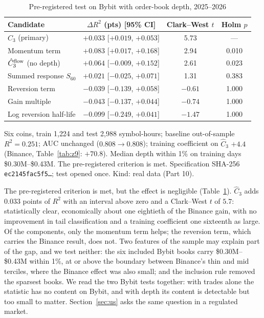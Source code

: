 \begin{table}[t]\centering\small
\begin{threeparttable}
\caption{Pre-registered test on Bybit with order-book depth, 2025--2026}\label{tab:bybitob}
\setlength{\tabcolsep}{3pt}
\begin{tabular}{lccc}
\toprule
Candidate & $\Delta R^2$ (pts) [95\% CI] & Clark--West $t$ & Holm $p$\\
\midrule
$\hat C_3$ (primary) & $+0.033$ [$+0.019$, $+0.053$] & 5.73 & ---\\
Momentum term & $+0.083$ [$+0.017$, $+0.168$] & 2.94 & 0.010\\
$\hat C_3^{\rm flow}$ (no depth) & $+0.064$ [$-0.009$, $+0.152$] & 2.61 & 0.023\\
Summed response $S_{60}$ & $+0.021$ [$-0.025$, $+0.071$] & 1.31 & 0.383\\
Reversion term & $-0.039$ [$-0.139$, $+0.058$] & $-0.61$ & 1.000\\
Gain multiple & $-0.043$ [$-0.137$, $+0.044$] & $-0.74$ & 1.000\\
Log reversion half-life & $-0.099$ [$-0.249$, $+0.041$] & $-1.47$ & 1.000\\
\bottomrule
\end{tabular}
\begin{tablenotes}\footnotesize\item Six coins, train 1{,}224 and test 2{,}988 symbol-hours; baseline out-of-sample $R^2=0.251$; AUC unchanged ($0.808\to0.808$); training coefficient on $\hat C_3$ $+4.4$ (Binance, Table~\ref{tab:z9}: $+70.8$). Median depth within 1\% on training days \$0.30M--\$0.43M. The pre-registered criterion is met. Specification SHA-256 \texttt{ec2145fac5f5\ldots}; test opened once. Kind: real data (Part 10).\end{tablenotes}
\end{threeparttable}
\end{table}

The pre-registered criterion is met, but the effect is negligible (Table~\ref{tab:bybitob}). $\hat C_3$ adds $0.033$ points of $R^2$ with an interval above zero and a Clark--West $t$ of $5.7$: statistically clear, economically about one eightieth of the Binance gain, with no improvement in tail classification and a training coefficient one sixteenth as large. Of the components, only the momentum term helps; the reversion term, which carries the Binance result, does not. Two features of the sample may explain part of the gap, and we test neither: the six included Bybit books carry \$0.30M--\$0.43M within 1\%, at or above the boundary between Binance's thin and mid terciles, where the Binance effect was also small; and the inclusion rule removed the sparsest books. We read the two Bybit tests together: with trades alone the statistic has no content on Bybit, and with depth its content is detectable but too small to matter. Section~\ref{sec:us} asks the same question in a regulated market.

